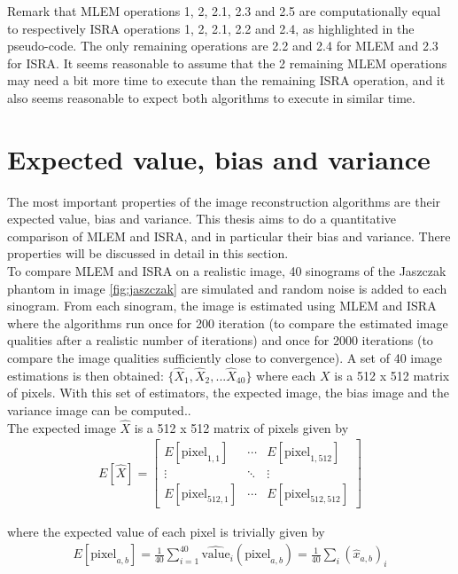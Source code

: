 \documentclass[report,12pt]{report}
\begin{document}
Remark that MLEM operations 1, 2, 2.1, 2.3 and 2.5 are computationally equal to respectively ISRA operations 1, 2, 2.1, 2.2 and 2.4, as highlighted in the pseudo-code. The only remaining operations are 2.2 and 2.4 for MLEM and 2.3 for ISRA. It seems reasonable to assume that the 2 remaining MLEM operations may need a bit more time to execute than the remaining ISRA operation, and it also seems reasonable to expect both algorithms to execute in similar time.



\section{Expected value, bias and variance}
The most important properties of the image reconstruction algorithms are their expected value, bias and variance. This thesis aims to do a quantitative comparison of MLEM and ISRA, and in particular their bias and variance. There properties will be discussed in detail in this section.\\

To compare MLEM and ISRA on a realistic image, 40 sinograms of the Jaszczak phantom in image \ref{fig:jaszczak} are simulated and random noise is added to each sinogram. From each sinogram, the image is estimated using MLEM and ISRA where the algorithms run once for 200 iteration (to compare the estimated image qualities after a realistic number of iterations) and once for 2000 iterations (to compare the image qualities sufficiently close to convergence). A set of 40 image estimations is then obtained: $\{\hat X_1, \hat X_2, ... \hat X_{40}\}$ where each $X$ is a 512 x 512 matrix of pixels. With this set of estimators, the expected image, the bias image and the variance image can be computed..\\

The expected image $\hat X$ is a 512 x 512 matrix of pixels given by
\begin{align}	
	E[\hat X] =  
	\left[ 
		{\begin{array}{ccc}
   			E[\text{pixel}_{1,1}] 		& \cdots 	&E[\text{pixel}_{1,512}]\\
   			\vdots				&\ddots	&\vdots\\
			E[\text{pixel}_{512,1}]	&\cdots	&E[\text{pixel}_{512,512}]
  		\end{array} } 
	\right]
\end{align}

where the expected value of each pixel is trivially given by
\begin{align}
	E[\text{pixel}_{a,b}] = \frac{1}{40}\sum_{i=1}^{40} \widehat{\text{value}}_i(\text{pixel}_{a,b}) = \frac{1}{40}\sum_i(\hat{x}_{a,b})_i
\end{align}
\end{document}
